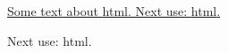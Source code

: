 \documentclass[12pt]{article}
\begin{document}
\GlsXtrStartUnsetBuffering
\ul{Some text about \mbox{\gls{html}}.
Next use: \mbox{\gls{html}}.}
\GlsXtrStopUnsetBuffering


Next use: \gls{html}. 
\end{document}

